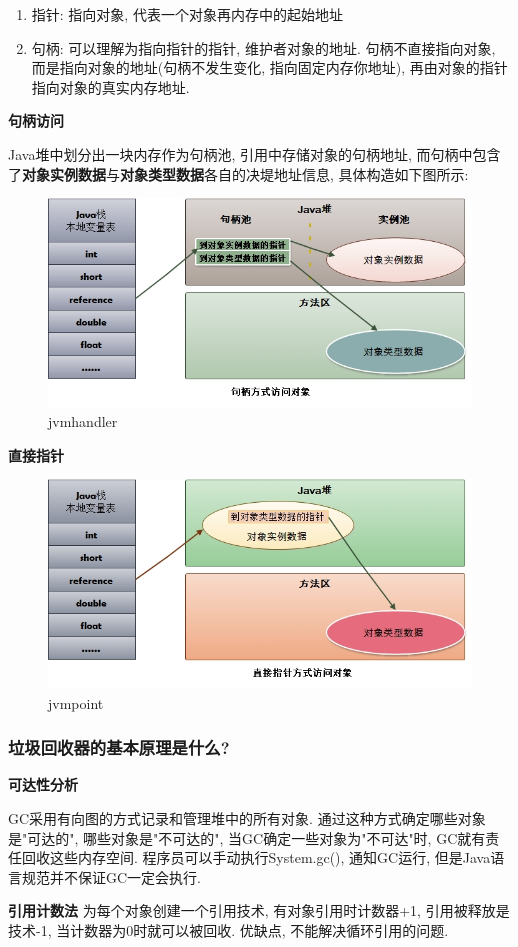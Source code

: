\documentclass[UTF8]{ctexart}
\begin{document}
\begin{enumerate}
	\item 指针: 指向对象, 代表一个对象再内存中的起始地址
	\item 句柄: 可以理解为指向指针的指针, 维护者对象的地址. 句柄不直接指向对象, 而是指向对象的地址(句柄不发生变化, 指向固定内存你地址), 再由对象的指针指向对象的真实内存地址.
\end{enumerate}
\textbf{句柄访问}
\par
Java堆中划分出一块内存作为句柄池, 引用中存储对象的句柄地址, 而句柄中包含了\textbf{对象实例数据}与\textbf{对象类型数据}各自的决堤地址信息, 具体构造如下图所示:
\begin{figure}
	\centering
	\includegraphics[width=0.7\linewidth]{figures/jvm_handler.jpg}
	\caption{jvmhandler}
	\label{fig:jvm_handler}
\end{figure}
\textbf{直接指针}
\par
\begin{figure}
	\centering
	\includegraphics[width=0.7\linewidth]{figures/jvm_point.jpg}
	\caption{jvmpoint}
	\label{fig:jvm_point}
\end{figure}
\subsubsection{垃圾回收器的基本原理是什么?}
\textbf{可达性分析}
\par
GC采用有向图的方式记录和管理堆中的所有对象. 通过这种方式确定哪些对象是"可达的", 哪些对象是"不可达的", 当GC确定一些对象为"不可达"时, GC就有责任回收这些内存空间.
程序员可以手动执行System.gc(), 通知GC运行, 但是Java语言规范并不保证GC一定会执行.
\par
\textbf{引用计数法}
为每个对象创建一个引用技术, 有对象引用时计数器+1, 引用被释放是技术-1, 当计数器为0时就可以被回收. 优缺点, 不能解决循环引用的问题.
\end{document}
